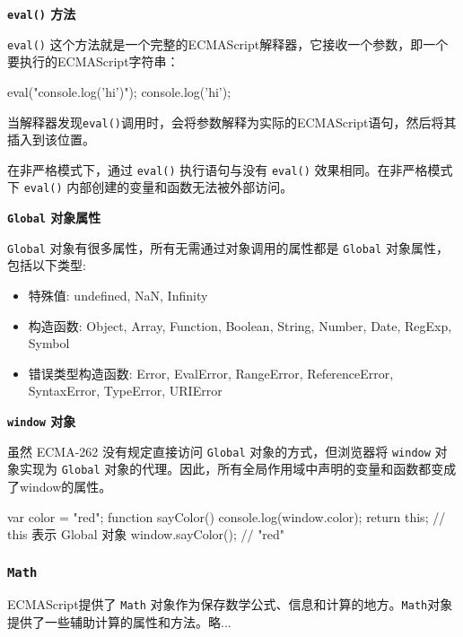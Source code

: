 \noindent\textbf{\texttt{eval()} 方法}

\texttt{eval()} 这个方法就是一个完整的ECMAScript解释器，它接收一个参数，即一个要执行的ECMAScript字符串：
\begin{JavaScript}
eval("console.log('hi')");
console.log('hi');
\end{JavaScript}

当解释器发现\texttt{eval()}调用时，会将参数解释为实际的ECMAScript语句，然后将其插入到该位置。

在非严格模式下，通过 \texttt{eval()} 执行语句与没有 \texttt{eval()} 效果相同。在非严格模式下 \texttt{eval()} 内部创建的变量和函数无法被外部访问。


\noindent\textbf{\texttt{Global} 对象属性}

\texttt{Global} 对象有很多属性，所有无需通过对象调用的属性都是 \texttt{Global} 对象属性，包括以下类型:
\begin{itemize}
    \item 特殊值: undefined, NaN, Infinity
    \item 构造函数: Object, Array, Function, Boolean, String, Number, Date, RegExp, Symbol
    \item 错误类型构造函数: Error, EvalError, RangeError, ReferenceError, SyntaxError, TypeError, URIError
\end{itemize}

\noindent\textbf{\texttt{window} 对象}

虽然 ECMA-262 没有规定直接访问 \texttt{Global} 对象的方式，但浏览器将 \texttt{window} 对象实现为 \texttt{Global} 对象的代理。因此，所有全局作用域中声明的变量和函数都变成了window的属性。

\begin{JavaScript}
var color = "red"; 
function sayColor() {   
    console.log(window.color);
    return this;   // this 表示 Global 对象 
} 
window.sayColor(); // "red" 
\end{JavaScript}

\subsubsection{\texttt{Math}}

ECMAScript提供了 \texttt{Math} 对象作为保存数学公式、信息和计算的地方。\texttt{Math}对象提供了一些辅助计算的属性和方法。略...

\newpage